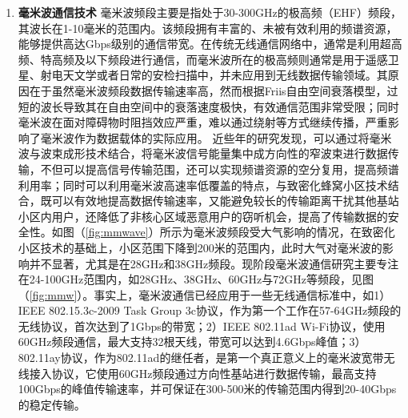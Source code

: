 \begin{enumerate}
\item \textbf{毫米波通信技术} \quad 毫米波频段主要是指处于30-300GHz的极高频（EHF）频段，其波长在1-10毫米的范围内。该频段拥有丰富的、未被有效利用的频谱资源，能够提供高达Gbps级别的通信带宽。在传统无线通信网络中，通常是利用超高频、特高频及以下频段进行通信，而毫米波所在的极高频则通常是用于遥感卫星、射电天文学或者日常的安检扫描中，并未应用到无线数据传输领域。其原因在于虽然毫米波频段数据传输速率高，然而根据Friis自由空间衰落模型，过短的波长导致其在自由空间中的衰落速度极快，有效通信范围非常受限；同时毫米波在面对障碍物时阻挡效应严重，难以通过绕射等方式继续传播，严重影响了毫米波作为数据载体的实际应用。
近些年的研究发现，可以通过将毫米波与波束成形技术结合，将毫米波信号能量集中成方向性的窄波束进行数据传输，不但可以提高信号传输范围，还可以实现频谱资源的空分复用，提高频谱利用率；同时可以利用毫米波高速率低覆盖的特点，与致密化蜂窝小区技术结合，既可以有效地提高数据传输速率，又能避免较长的传输距离干扰其他基站小区内用户，还降低了非核心区域恶意用户的窃听机会，提高了传输数据的安全性。如图（\ref{fig:mmwave}）所示为毫米波频段受大气影响的情况，在致密化小区技术的基础上，小区范围下降到200米的范围内，此时大气对毫米波的影响并不显著，尤其是在28GHz和38GHz频段\cite{rappaport2013millimeter}。现阶段毫米波通信研究主要专注在24-100GHz范围内，如28GHz\cite{pi2011introduction}、38GHz\cite{sulyman2014radio}、60GHz\cite{li2014efficient}与72GHz\cite{nie201372}等频段，见图（\ref{fig:mmw}）。事实上，毫米波通信已经应用于一些无线通信标准中，如1）IEEE 802.15.3c-2009 Task Group 3c协议\cite{802153}，作为第一个工作在57-64GHz频段的无线协议，首次达到了1Gbps的带宽；2）IEEE 802.11ad Wi-Fi协议\cite{80211ad}，使用60GHz频段通信，最大支持32根天线，带宽可以达到4.6Gbps峰值；3）802.11ay协议\cite{80211ay,ghasempour2017ieee}，作为802.11ad的继任者，是第一个真正意义上的毫米波宽带无线接入协议，它使用60GHz频段通过方向性基站进行数据传输，最高支持100Gbps的峰值传输速率，并可保证在300-500米的传输范围内得到20-40Gbps的稳定传输。


\end{enumerate}

